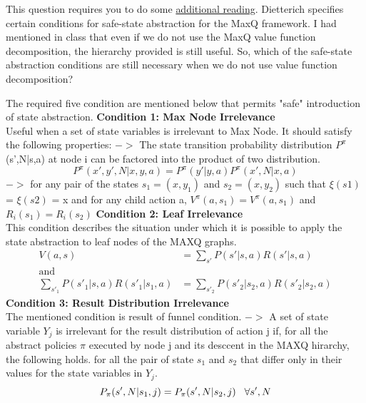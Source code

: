 \documentclass[solution,addpoints,12pt]{exam}
\begin{document}
\begin{questions}
\question[4]
This question requires you to do some \href{https://arxiv.org/abs/cs/9905014}{additional reading}.  Dietterich specifies certain conditions for safe-state abstraction for the MaxQ framework.  I had mentioned in class that even if we do not use the MaxQ value function decomposition, the hierarchy provided is still useful.  So, which of the safe-state abstraction conditions are still necessary when we do not use value function decomposition?
\begin{solution}
The required five condition are mentioned below that permits "safe" introduction of state abstraction.
\subitem \textbf{Condition 1: Max Node Irrelevance} \\
 Useful when a set of state variables is irrelevant to Max Node. It should satisfy the following properties:
 \subsubitem $->$ The state transition probability distribution $P^\pi$(s',N|s,a) at node i can be factored into the product of two distribution.
 \begin{equation}
 	P^\pi(x',y',N|x,y,a) = P^\pi(y'|y,a) P^\pi(x',N|x,a)
 \end{equation}
 \subsubitem $->$ for any pair of the states $s_1 = (x,y_1)$ and $s_2 = (x,y_2)$ such that $\xi(s1)$ = $\xi(s2)$ = x and for any child action a, $V^\pi(a,s_1) = V^\pi(a,s_1)$ and $R_i(s_1) = R_i(s_2)$
\subitem  \textbf{Condition 2: Leaf Irrelevance} \\ This condition describes the situation under which it is possible to apply the state abstraction to leaf nodes of the MAXQ graphs. 
\begin{equation}
\begin{aligned}
	V(a,s) &= \sum_{s'} P(s'|s,a) R(s'|s,a) \\
	\text{and} \\
	\sum_{s'_1} P(s'_1|s,a) R(s'_1|s_1,a) &= \sum_{s'_2} P(s'_2|s_2,a) R(s'_2|s_2,a)
\end{aligned}
\end{equation}
\subitem \textbf{Condition 3: Result Distribution Irrelevance} \\
The mentioned condition is result of funnel condition.
\subsubitem $->$ A set of state variable $Y_j$ is irrelevant for the result distribution of action j if, for all the abstract policies $\pi$ executed by node j and its desccent in the MAXQ hirarchy, the following holds. for all the pair of state $s_1$ and $s_2$ that differ only in their values for the state variables in $Y_j$.
\begin{equation}
	P_\pi(s',N|s_1,j) = P_\pi(s',N|s_2,j) \hspace{3mm} \forall s',N

\end{equation}
\end{solution}
\end{questions}
\end{document}

